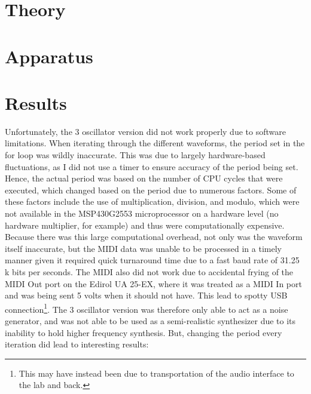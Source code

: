 \documentclass[12pt]{article}
\begin{document}
\section{Theory}\label{sec:theory}


\section{Apparatus}\label{sec:apparatus}


\section{Results}\label{sec:results}

Unfortunately, the 3 oscillator version did not work properly due to software limitations.
When iterating through the different waveforms, the period set in the for loop was wildly inaccurate.
This was due to largely hardware-based fluctuations, as I did not use a timer to ensure accuracy of the period being set.
Hence, the actual period was based on the number of CPU cycles that were executed, which changed based on the period due to numerous factors.
Some of these factors include the use of multiplication, division, and modulo, which were not available in the MSP430G2553 microprocessor on a hardware level (no hardware multiplier, for example) and thus were computationally expensive.
Because there was this large computational overhead, not only was the waveform itself inaccurate, but the MIDI data was unable to be processed in a timely manner given it required quick turnaround time due to a fast baud rate of 31.25 k bits per seconds. The MIDI also did not work due to accidental frying of the MIDI Out port on the Edirol UA 25-EX, where it was treated as a MIDI In port and was being sent 5 volts when it should not have. This lead to spotty USB connection\footnote{This may have instead been due to transportation of the audio interface to the lab and back.}.
The 3 oscillator version was therefore only able to act as a noise generator, and was not able to be used as a semi-realistic synthesizer due to its inability to hold higher frequency synthesis. But, changing the period every iteration did lead to interesting results:
\end{document}
